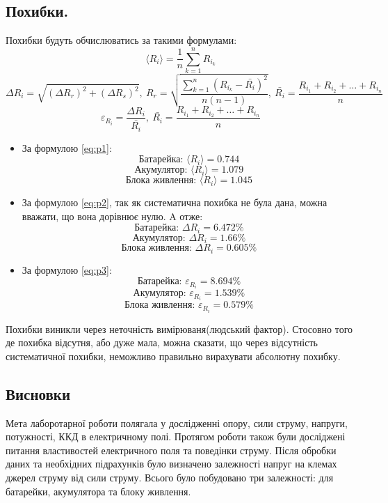 \documentclass[a4paper,12pt]{article}
\begin{document}
\begin{justify}
	\subsection{Похибки.}
	Похибки будуть обчислюватись за такими формулами:
	\begin{equation}\label{eq:p1}
		\langle R_i\rangle=\dfrac1n\sum_{k=1}^{n}R_{i_k}
	\end{equation}
	\begin{equation}\label{eq:p2}
		\Delta R_i=\sqrt{(\Delta R_r)^2+(\Delta R_s)^2},\>R_r=\sqrt{\dfrac{\displaystyle\sum_{k=1}^{n}(R_{i_k}-\bar{R_i})^2}{n(n-1)}},\>\bar{R_i}=\dfrac{R_{i_1}+R_{i_2}+\dots+R_{i_n}}{n}
	\end{equation}	
	\begin{equation}\label{eq:p3}
		\varepsilon_{R_i}=\dfrac{\Delta R_i}{\bar{R_i}},\>\bar{R_i}=\dfrac{R_{i_1}+R_{i_2}+\dots+R_{i_n}}{n}
	\end{equation}
	\begin{itemize}
		\item За формулою \ref{eq:p1}: $$\textrm{Батарейка: }\langle R_i\rangle=0.744$$ $$\textrm{Акумулятор: }\langle R_i\rangle=1.079$$ $$\textrm{Блока живлення: }\langle R_i\rangle=1.045$$
		\item За формулою \ref{eq:p2}, так як систематична похибка не була дана, можна вважати, що вона дорівнює нулю. A отже: $$\textrm{Батарейка: }\Delta R_i=6.472\%$$ $$\textrm{Акумулятор: }\Delta R_i=1.66\%$$ $$\textrm{Блока живлення: }\Delta R_i=0.605\%$$
		\item За формулою \ref{eq:p3}: $$\textrm{Батарейка: }\varepsilon_{R_i}=8.694\%$$ $$\textrm{Акумулятор: }\varepsilon_{R_i}=1.539\%$$ $$\textrm{Блока живлення: }\varepsilon_{R_i}=0.579\%$$
	\end{itemize}
	Похибки виникли через неточність вимірюваня(людський фактор). Стосовно того де похибка відсутня, або дуже мала, можна сказати, що через відсутність систематичної похибки, неможливо правильно вирахувати абсолютну похибку.
	
	\subsection{Висновки}	
	Мета лаборотарної роботи полягала у дослідженні опору, сили струму, напруги, потужності, ККД в електричному полі. Протягом роботи також були досліджені питання властивостей електричного поля та поведінки струму. Після обробки даних та необхідних підрахунків було визначено залежності напруг на клемах джерел струму від сили струму. Всього було побудовано три залежності: для батарейки, акумулятора та блоку живлення. 

\end{justify}
\end{document}

